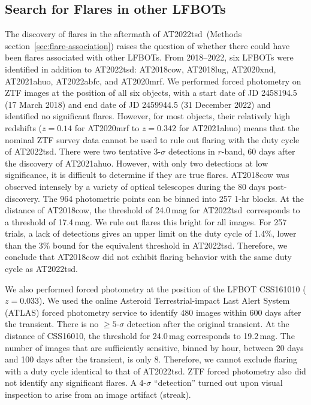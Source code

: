 \documentclass{nature_plusfigure}
\newcommand{\at}{AT2022tsd}
\begin{document}
\begin{methods}
\section{Search for Flares in other LFBOTs}
\label{sec:flare-search}

The discovery of flares in the aftermath of \at\ (Methods section~\ref{sec:flare-association}) raises the question of whether there could have been flares associated with other LFBOTs. 
From 2018--2022, six LFBOTs were identified in addition to \at: AT2018cow\cite{Prentice2018}, AT2018lug\cite{Ho2020_Koala}, AT2020xnd\cite{Perley2021}, AT2021ahuo, AT2022abfc\cite{Ho2022_AT2022abfc},  
and AT2020mrf\cite{Yao2022}. 
We performed forced photometry on ZTF images at the position of all six objects, with a start date of JD 2458194.5 (17 March 2018) and end date of JD 2459944.5 (31 December 2022) and identified no significant flares.
However, for most objects, their relatively high redshifts ($z=0.14$ for AT2020mrf\cite{Yao2022} to $z=0.342$ for AT2021ahuo) means that the nominal ZTF survey data cannot be used to rule out flaring with the duty cycle of \at.
There were two tentative 3-$\sigma$ detections in $r$-band, 60 days after the discovery of AT2021ahuo. However, with only two detections at low significance, it is difficult to determine if they are true flares.
AT2018cow was observed intensely by a variety of optical telescopes during the 80 days post-discovery\cite{Perley2019}. The 964 photometric points can be binned into 257 1-hr blocks. At the distance of AT2018cow, the threshold of 24.0\,mag for \at\ corresponds to a threshold of 17.4\,mag. We rule out flares this bright for all images. For 257 trials, a lack of detections gives an upper limit on the duty cycle of 1.4\%, lower than the 3\% bound for the equivalent threshold in \at. Therefore, we conclude that AT2018cow did not exhibit flaring behavior with the same duty cycle as \at.

We also performed forced photometry at the position of the LFBOT CSS161010\cite{Coppejans2020} ($z=0.033$). 
We used the online Asteroid Terrestrial-impact Last Alert System (ATLAS)\cite{Tonry2018,Smith2020} forced photometry service\cite{Shingles2021} to identify 480 images within 600 days after the transient. There is no $\geq5$-$\sigma$ detection after the original transient. At the distance of CSS16010, the threshold for 24.0\,mag corresponds to 19.2\,mag. The number of images that are sufficiently sensitive, binned by hour, between 20 days and 100 days after the transient, is only 8. Therefore, we cannot exclude flaring with a duty cycle identical to that of \at.
ZTF forced photometry also did not identify any significant flares. A 4-$\sigma$ ``detection'' turned out upon visual inspection to arise from an image artifact (streak). 


\end{methods}
\end{document}
